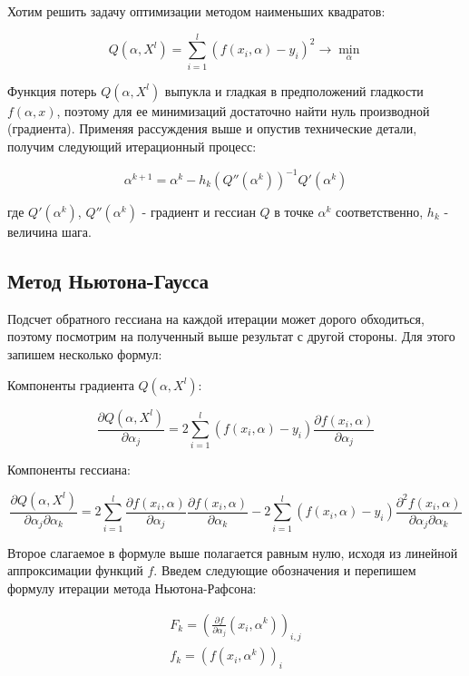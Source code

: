 {Хотим решить задачу оптимизации методом наименьших квадратов:

\[
    Q(\alpha, X^{l}) = \sum\limits_{i = 1}^{l}\left(f(x_{i}, \alpha) - y_{i} \right)^{2} \to \min_{\alpha}
\]

Функция потерь \( Q(\alpha, X^{l}) \) выпукла и гладкая в предположений гладкости \( f(\alpha, x) \), поэтому для ее минимизаций достаточно найти нуль производной (градиента). Применяя рассуждения выше и опустив технические детали, получим следующий итерационный процесс:

\[
    \alpha^{k + 1} = \alpha^{k} - h_{k}\left(Q''( \alpha^{k} )\right)^{-1} Q'(\alpha^{k})
\]

где \( Q'( \alpha^{k} ) \), \( Q''(\alpha^{k} ) \) - градиент и гессиан \( Q \) в точке \( \alpha^{k} \) соответственно, \( h_{k} \) - величина шага.
\subsection*{Метод Ньютона-Гаусса}

Подсчет обратного гессиана на каждой итерации может дорого обходиться, поэтому посмотрим на полученный выше результат с другой стороны. Для этого запишем несколько формул:

Компоненты градиента \( Q(\alpha, X^{l}) \):

\[
    \frac{\partial Q(\alpha, X^{l})}{\partial\alpha_{j}} = 2 \sum\limits_{i = 1}^{l} \left(f(x_{i}, \alpha) - y_{i} \right)\frac{\partial f(x_{i}, \alpha)}{\partial\alpha_{j}}
\]

Компоненты гессиана:

\[
    \frac{\partial Q(\alpha, X^{l})}{\partial\alpha_{j}\partial\alpha_{k}} = 2\sum\limits_{i = 1}^{l}\frac{\partial f(x_{i}, \alpha)}{\partial\alpha_{j}}\frac{\partial f(x_{i}, \alpha)}{\partial\alpha_{k}} - 2\sum\limits_{i = 1}^{l}\left(f(x_{i}, \alpha) - y_{i}\right)\frac{\partial^2 f(x_{i}, \alpha)}{\partial\alpha_{j}\partial\alpha_{k}}
\]

Второе слагаемое в формуле выше полагается равным нулю, исходя из линейной аппроксимации функций \( f \). Введем следующие обозначения и перепишем формулу итерации метода Ньютона-Рафсона:

\begin{gather*}
    F_{k} = \left( \frac{\partial f}{\partial\alpha_{j}}(x_{i}, \alpha^{k}) \right)_{i, j}\\[1em]
    f_{k} = \left( f(x_{i}, \alpha^{k}) \right)_{i}
\end{gather*}

}
